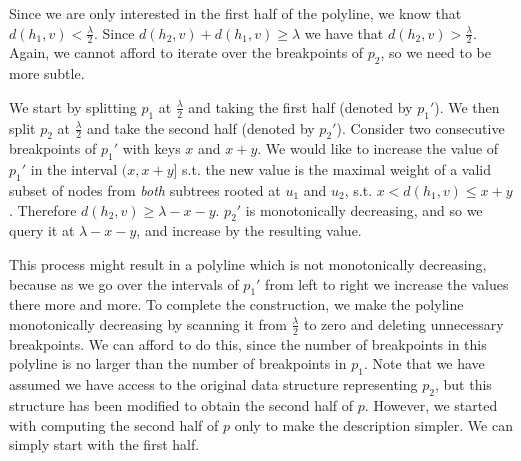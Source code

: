 \documentclass[11pt,a4paper]{article}
\theoremstyle{definition}
\theoremstyle{remark}
\begin{document}
\vspace{0.04in}  Since we are only interested in the first half of the polyline, we know that $d(h_1,v) < \frac{\lambda}{2}$. Since $d(h_2,v) +d(h_1,v)\geq \lambda$ we have that  $d(h_2,v) > \frac{\lambda}{2}$. Again, we cannot afford to iterate over the breakpoints of $p_2$, so we need to be more subtle.

We start by splitting $p_1$ at $\frac{\lambda}{2}$ and taking the first half (denoted by $p_1'$). We then split $p_2$ at $\frac{\lambda}{2}$
and take the second half (denoted by $p_2'$). Consider two consecutive breakpoints of $p_1'$ with keys $x$ and $x+y$. We would like to increase the value of $p_1'$ in the interval $(x,x+y]$ s.t. the new value is the maximal weight of a valid subset of nodes from \emph{both} subtrees rooted at $u_1$ and $u_2$, s.t. $x < d(h_1,v) \leq x+y$. Therefore $d(h_2,v) \ge \lambda-x-y$. $p_2'$ is monotonically decreasing, and so we query it at $\lambda-x-y$, and increase by the resulting value.

This process might result in a polyline which is not monotonically decreasing, because as we go over the intervals of $p_1'$ from left to right we increase the values there more and more.
To complete the construction, we make the polyline monotonically decreasing by scanning it from $\frac{\lambda}{2}$ to zero and deleting unnecessary breakpoints. We can afford to do this, since the number of breakpoints in this polyline is no larger than the number of breakpoints in $p_1$.
%
Note that we have assumed we have access to the original data structure representing $p_{2}$, but this structure has been  modified to obtain the second half of $p$. However, we started with computing the second half of $p$ only to make the description simpler. We can simply start with the first half.

\end{document}
